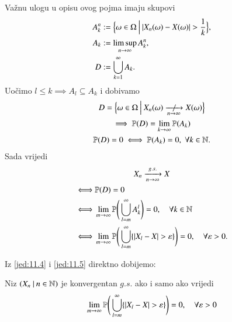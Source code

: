 Va\v znu ulogu u opisu ovog pojma imaju skupovi
\begin{equation*}
    \begin{aligned}
        A_k^n &:= \Big\{ {\omega \in \Omega} \: \Big| \: {|X_n(\omega) - X(\omega)| > \frac{1}{k}} \Big\},\\
        A_k &:= \limsup\limits_{n \to \infty} A_k^n,\\
        D &:= \bigcup\limits_{k = 1}^{\infty} A_k.
    \end{aligned}
\end{equation*}
Uo\v cimo $l \leq k \implies A_l \subseteq A_k$ i dobivamo
\begin{equation*}
    \begin{gathered}
        D = \bigSkup{\omega \in \Omega}{X_n(\omega) \centernot{\xrightarrow[n \to \infty]{}}X(\omega)}\\
        \implies  \vjeroj{D} = \lim\limits_{k \to \infty} \vjeroj{A_k}\\
        \vjeroj{D} = 0 \iff \vjeroj{A_k} = 0, \; \forall k \in \nat.
    \end{gathered}
\end{equation*}
Sada vrijedi
\begin{equation}    \label{jed:11.5}
    \begin{gathered}
        X_n \xrightarrow[n \to \infty]{g.s.} X\\
        \begin{aligned}
            \iff &\mathbb{P}({D}) = 0\\
            \iff &\lim\limits_{m \to \infty} \mathbb{P} \Bigg( \bigcup\limits_{l = m}^{\infty} A_k^l \Bigg) = 0, \quad \forall k \in \mathbb{N}\\
            \iff &\lim\limits_{m \to \infty} \mathbb{P} \Bigg( \bigcup\limits_{l = m}^{\infty} \{ |X_l - X| > \varepsilon \} \Bigg) = 0, \quad \forall \varepsilon > 0.
        \end{aligned}
    \end{gathered}
\end{equation}

Iz \eqref{jed:11.4} i \eqref{jed:11.5} direktno dobijemo:

\begin{lm}  \label{lm:11.6}
    Niz $({X_n} \: | \: {n \in \mathbb{N}})$ je konvergentan $g.s.$ ako i samo ako vrijedi
    \begin{equation*}
        \lim\limits_{m \to \infty} \mathbb{P} \Bigg( \bigcup\limits_{l = m}^{\infty} \{ |X_l - X| > \varepsilon \} \Bigg) = 0, \quad \forall \varepsilon > 0
    \end{equation*}
\end{lm}

